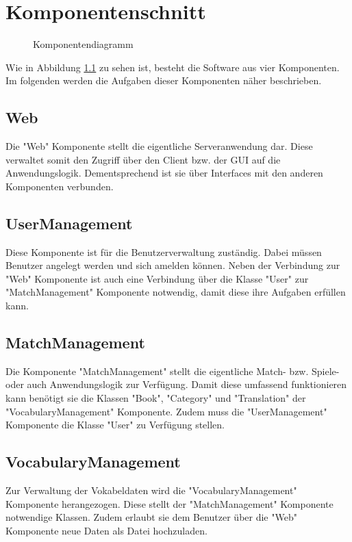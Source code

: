 \chapter{Komponentenschnitt}
\begin{figure}[H]
    \centering
    \caption{Komponentendiagramm}
    \label{komp}
\end{figure}
Wie in Abbildung \ref{komp} zu sehen ist, besteht die Software aus vier Komponenten. Im folgenden werden die Aufgaben dieser Komponenten näher beschrieben.
\section*{Web}
Die "Web" Komponente stellt die eigentliche Serveranwendung dar. Diese verwaltet somit den Zugriff über den Client bzw. der GUI auf die Anwendungslogik. Dementsprechend ist sie über Interfaces mit den anderen Komponenten verbunden.
\section*{UserManagement}
Diese Komponente ist für die Benutzerverwaltung zuständig. Dabei müssen Benutzer angelegt werden und sich amelden können. Neben der Verbindung zur "Web" Komponente ist auch eine Verbindung über die Klasse "User" zur "MatchManagement" Komponente notwendig, damit diese ihre Aufgaben erfüllen kann.
\section*{MatchManagement}
Die Komponente "MatchManagement" stellt die eigentliche Match- bzw. Spiele- oder auch Anwendungslogik zur Verfügung. Damit diese umfassend funktionieren kann benötigt sie die Klassen "Book", "Category" und "Translation" der "VocabularyManagement" Komponente. Zudem muss die "UserManagement" Komponente die Klasse "User" zu Verfügung stellen.
\section*{VocabularyManagement}
Zur Verwaltung der Vokabeldaten wird die "VocabularyManagement" Komponente herangezogen. Diese stellt der "MatchManagement" Komponente notwendige Klassen. Zudem erlaubt sie dem Benutzer über die "Web" Komponente neue Daten als Datei hochzuladen.
\clearpage
